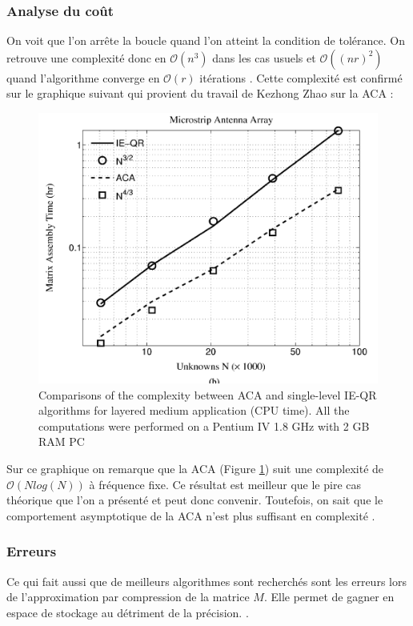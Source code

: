 \documentclass[10pt]{SelfArx} %
\begin{document}
\subsubsection{Analyse du coût}
On voit que l'on arrête la boucle quand l'on atteint la condition de tolérance. On retrouve une complexité donc en $\mathcal{O}(n^3)$ dans les cas usuels et $\mathcal{O}((nr)^2)$ quand l'algorithme converge en $\mathcal{O}(r)$ itérations \cite{bebendorf_hierarchical_2008}. Cette complexité est confirmé sur le graphique suivant qui provient du travail de Kezhong Zhao sur la ACA :

\begin{figure}[ht]\centering
	\includegraphics[width=\linewidth]{zhoa_time_assembly.png}
	\captionsetup{justification=centering}
	\caption{Comparisons of the complexity between ACA and single-level IE-QR algorithms for layered medium application (CPU time). All the computations were performed on a Pentium IV 1.8 GHz with 2 GB RAM PC \cite{zhao_adaptive_2005}}
	\label{fig:zhoa_time_assembly}
\end{figure}

Sur ce graphique on remarque que la ACA (Figure \ref{fig:zhoa_time_assembly}) suit une complexité de $\mathcal{O}(Nlog(N))$ à fréquence fixe. Ce résultat est meilleur que le pire cas théorique que l'on a présenté et peut donc convenir. Toutefois, on sait que le comportement asymptotique de la ACA n'est plus suffisant en complexité \cite{tamayo_multilevel_2011}.

\subsubsection{Erreurs}
Ce qui fait aussi que de meilleurs algorithmes sont recherchés sont les erreurs lors de l'approximation par compression de la matrice $M$. Elle permet de gagner en espace de stockage au détriment de la précision. \cite{zhao_adaptive_2005}.
\end{document}
